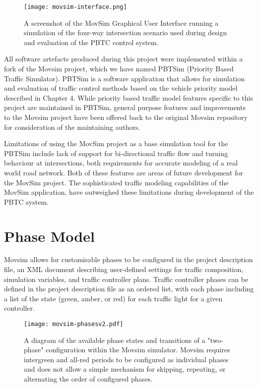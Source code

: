\begin{figure}[]
\centering
	\texttt{[image: movsim-interface.png]}
	\caption{ A screenshot of the MovSim Graphical User Interface running a simulation of the four-way intersection scenario used during design and evaluation of the PBTC control system. }
\label{intersectiondiagram}
\end{figure}

All software artefacts produced during this project were implemented within a fork of the Movsim project, which we have named PBTSim (Priority Based Traffic Simulator). PBTSim is a software application that allows for simulation and evaluation of traffic control methods based on the vehicle priority model described in Chapter 4. While priority based traffic model features specific to this project are maintained in PBTSim, general purpose features and improvements to the Movsim project have been offered back to the original Movsim repository for consideration of the maintaining authors.

Limitations of using the MovSim project as a base simulation tool for the PBTSim include lack of support for bi-directional traffic flow and turning behaviour at intersections, both requirements for accurate modeling of a real world road network. Both of these features are areas of future development for the MovSim project. The sophisticated traffic modeling capabilities of the MovSim application, have outweighed these limitations during development of the PBTC system.

\section{Phase Model}

Movsim allows for customisable phases to be configured in the project description file, an XML document describing user-defined settings for traffic composition, simulation variables, and traffic controller plans. Traffic controller phases can be defined in the project description file as an ordered list, with each phase including a list of the state (green, amber, or red) for each traffic light for a given controller. 

\begin{figure}[]
\centering
	\texttt{[image: movsim-phasesv2.pdf]}
	\caption{ A diagram of the available phase states and transitions of a "two-phase" configuration within the Movsim simulator. Movsim requires intergreen and all-red periods to be configured as individual phases and does not allow a simple mechanism for skipping, repeating, or alternating the order of configured phases. }
\label{movsimphasediagram}
\end{figure}

